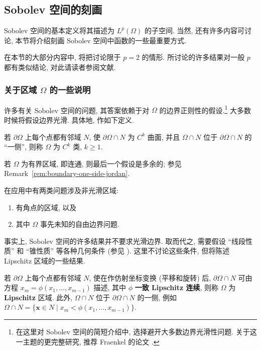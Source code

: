\subsection{Sobolev 空间的刻画}\label{sec:sobolev-characterizations}

Sobolev 空间的基本定义将其描述为 $L^p(\Omega)$ 的子空间. 当然, 还有许多内容可讨论, 本节将介绍刻画 Sobolev 空间中函数的一些最重要方式.

在本节的大部分内容中, 将把讨论限于 $p=2$ 的情形. 所讨论的许多结果对一般 $p$ 都有类似结论, 对此请读者参阅文献.

\subsubsection{关于区域 $\Omega$ 的一些说明}\label{subsec:sobolev-domain-boundary-hypotheses}

许多有关 Sobolev 空间的问题, 其答案依赖于对 $\Omega$ 的边界正则性的假设.\footnote{在这里对 Sobolev 空间的简短介绍中, 选择避开大多数边界光滑性问题. 关于这一主题的更完整研究, 推荐 Fraenkel 的论文 \cite{Fr}.} 大多数时候将假设边界光滑. 具体地, 作如下定义.

\begin{Definition}
\label{def:c-k-domain-boundary}
若 $\partial\Omega$ 上每个点都有邻域 $N$, 使 $\partial\Omega\cap N$ 为 $C^k$ 曲面, 并且 $\Omega\cap N$ 位于 $\partial\Omega\cap N$ 的 ``一侧'', 则称 $\Omega$ 为 $C^k$ 类, $k\geq1$.
\end{Definition}

若 $\Omega$ 为有界区域, 即连通, 则最后一个假设是多余的; 参见 Remark~\ref{rem:boundary-one-side-jordan}.

在应用中有两类问题涉及非光滑区域:\begin{enumerate}
\item 有角点的区域, 以及
\item 其中 $\Omega$ 事先未知的自由边界问题.
\end{enumerate}事实上, Sobolev 空间的许多结果并不要求光滑边界. 取而代之, 需要假设 ``线段性质'' 和 ``锥性质'' 等各种几何条件 (参见 \cite{Fr}). 这里不讨论这些条件, 但将陈述 Lipschitz 区域的一些结果.

\begin{Definition}
\label{def:lipschitz-domain}
若 $\partial\Omega$ 上每个点都有邻域 $N$, 使在作仿射坐标变换 (平移和旋转) 后, $\partial\Omega\cap N$ 可由方程 $x_m=\phi(x_1,\ldots,x_{m-1})$ 描述, 其中 $\phi$ \textbf{一致 Lipschitz 连续}, 则称 $\Omega$ 为 \textbf{Lipschitz} 区域. 此外, $\Omega\cap N$ 位于 $\partial\Omega\cap N$ 的一侧, 例如 $\Omega\cap N=\{\bm{x}\in N\mid x_m<\phi(x_1,\ldots,x_{m-1})\}$.
\end{Definition}

